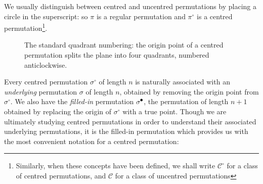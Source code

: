 \documentclass[11pt,a4paper]{article}
\newcommand{\plotptradius}{4pt}
\theoremstyle{definition}
\newtheorem{comment}[thm]{Comment}
\newcommand{\tikzcircle}[2][black,fill=black]{\tikz[baseline=-0.5ex]\draw[#1,radius=#2] (0,0) circle ;}
\begin{document}
We usually distinguish between centred and uncentred permutations by placing a circle in the superscript: so $\pi$ is a regular permutation and $\pi^{\circ}$ is a centred permutation\footnote{Similarly, when these concepts have been defined, we shall write $\mathcal{C}^{\circ}$ for a class of centred permutations, and  $\mathcal{C}$ for a class of uncentred permutations}.

\begin{figure}[h]
\begin{center}
\end{center}
\caption{The standard quadrant numbering: the origin point of a centred permutation splits the plane into four quadrants, numbered anticlockwise.}
\label{fig:quadnumbering}
\end{figure}
Every centred permutation $\sigma^{\circ}$ of length $n$ is naturally associated with an \emph{underlying} permutation $\sigma$ of length $n$, obtained by removing the origin point from $\sigma^{\circ}$. We also have the \emph{filled-in} permutation $\sigma^{\tikzcircle{1.5pt}}$, the permutation of length $n+1$ obtained by replacing the origin of $\sigma^{\circ}$ with a true point. Though we are ultimately studying centred permutations in order to understand their associated underlying permutations, it is the filled-in permutation which provides us with the most convenient notation for a centred permutation:
\end{document}
